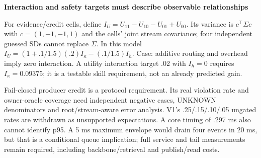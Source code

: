 \documentclass[10pt,a4paper]{article}
\newcommand{\lead}[1]{\vspace{3pt}\textbf{#1}\par}
\begin{document}
\lead{Interaction and safety targets must describe observable relationships}
For evidence/credit cells, define $I_U=U_{11}-U_{10}-U_{01}+U_{00}$.
Its variance is $c^\top\Sigma c$ with $c=(1,-1,-1,1)$ and the cells' joint
stream covariance; four independent guessed SDs cannot replace $\Sigma$.
In this model $I_U=(1+.1/1.5)(.2)I_\kappa-(.1/1.5)I_h$.
Case: additive routing and overhead imply zero interaction. A utility interaction
target .02 with $I_h=0$ requires $I_\kappa=0.09375$;
it is a testable skill requirement, not an already predicted gain.

Fail-closed producer credit is a protocol requirement. Its real violation rate
and owner-oracle coverage need independent negative cases, UNKNOWN denominators
and root/stream-aware error analysis. V1's .25/.15/.10/.05 ungated rates are
withdrawn as unsupported expectations. A core timing of .297 ms also cannot
identify p95. A 5 ms maximum envelope would drain four events in 20 ms, but that
is a conditional queue implication; full service and tail measurements remain
required, including backbone/retrieval and publish/read costs.
\end{document}
